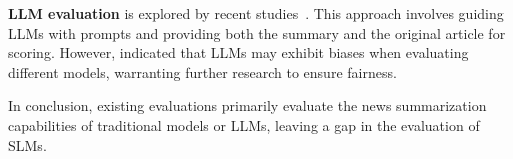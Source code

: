 \noindent \textbf{LLM evaluation} is explored by recent studies~\cite{goyal2022news,kendeer,gao2023human-like,liu2023benchmarking,wang2023chatgpt}. This approach involves guiding LLMs with prompts and providing both the summary and the original article for scoring. However, \citet{not-yet} indicated that LLMs may exhibit biases when evaluating different models, warranting further research to ensure fairness.

In conclusion, existing evaluations primarily evaluate the news summarization capabilities of traditional models or LLMs, leaving a gap in the evaluation of SLMs.







